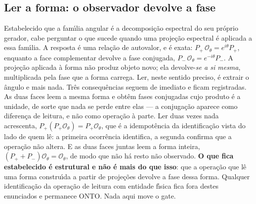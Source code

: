 \documentclass[11pt]{article}
\theoremstyle{definition}\newtheorem{deriv}{Derivação}
\begin{document}
\subsection*{Ler a forma: o observador devolve a fase}Estabelecido que a fam\'\i{}lia angular \'e a decomposi\c{c}\~ao espectral do seu pr\'oprio gerador, cabe perguntar o que sucede quando uma proje\c{c}\~ao espectral \'e aplicada a essa fam\'\i{}lia. A resposta \'e uma rela\c{c}\~ao de autovalor, e \'e exata: $P_+\,\mathcal{O}_\theta = e^{i\theta}P_+$, enquanto a face complementar devolve a fase conjugada, $P_-\,\mathcal{O}_\theta = e^{-i\theta}P_-$. A proje\c{c}\~ao aplicada \`a forma n\~ao produz objeto novo; ela devolve-\emph{se a si mesma}, multiplicada pela fase que a forma carrega. Ler, neste sentido preciso, \'e extrair o \^angulo e mais nada. Tr\^es consequ\^encias seguem de imediato e ficam registradas. As duas faces leem a mesma forma e obt\^em fases conjugadas cujo produto \'e a unidade, de sorte que nada se perde entre elas --- a conjuga\c{c}\~ao aparece como diferen\c{c}a de leitura, e n\~ao como opera\c{c}\~ao \`a parte. Ler duas vezes nada acrescenta, $P_+(P_+\mathcal{O}_\theta) = P_+\mathcal{O}_\theta$, que \'e a idempot\^encia da identifica\c{c}\~ao vista do lado de quem l\^e: a primeira ocorr\^encia identifica, a segunda confirma que a opera\c{c}\~ao n\~ao altera. E as duas faces juntas leem a forma inteira, $(P_+ + P_-)\mathcal{O}_\theta = \mathcal{O}_\theta$, de modo que n\~ao h\'a resto n\~ao observado. \textbf{O que fica estabelecido \'e estrutural e n\~ao \'e mais do que isso}: que a opera\c{c}\~ao que l\^e uma forma constru\'\i{}da a partir de proje\c{c}\~oes devolve a fase dessa forma. Qualquer identifica\c{c}\~ao da opera\c{c}\~ao de leitura com entidade f\'\i{}sica fica fora destes enunciados e permanece \textsf{ONTO}. Nada aqui move o gate.
\end{document}

